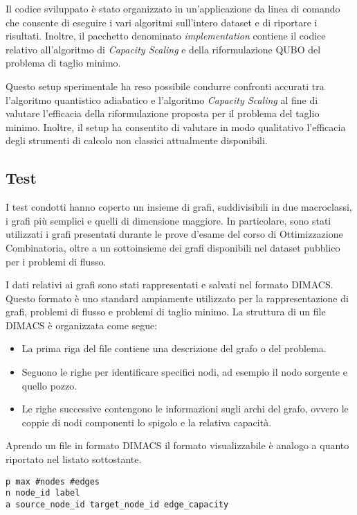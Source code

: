 \documentclass{article}
\begin{document}
Il codice sviluppato è stato organizzato in un'applicazione da linea di comando che consente di eseguire i vari algoritmi sull'intero dataset e di riportare i risultati. Inoltre, il pacchetto denominato \emph{implementation} contiene il codice relativo all'algoritmo di \emph{Capacity Scaling} e della riformulazione QUBO del problema di taglio minimo.

Questo setup sperimentale ha reso possibile condurre confronti accurati tra l'algoritmo quantistico adiabatico e l'algoritmo \emph{Capacity Scaling} al fine di valutare l'efficacia della riformulazione proposta per il problema del taglio minimo. Inoltre, il setup ha consentito di valutare in modo qualitativo l'efficacia degli strumenti di calcolo non classici attualmente disponibili.
\pagebreak

\subsection{Test}
I test condotti hanno coperto un insieme di grafi, suddivisibili in due macroclassi, i grafi più semplici e quelli di dimensione maggiore. In particolare, sono stati utilizzati i grafi presentati durante le prove d'esame del corso di Ottimizzazione Combinatoria, oltre a un sottoinsieme dei grafi disponibili nel dataset pubblico per i problemi di flusso\cite{Jensen2022}.

I dati relativi ai grafi sono stati rappresentati e salvati nel formato \textsc{DIMACS}. Questo formato è uno standard ampiamente utilizzato per la rappresentazione di grafi, problemi di flusso e problemi di taglio minimo. La struttura di un file \textsc{DIMACS} è organizzata come segue:

\begin{itemize}
    \item La prima riga del file contiene una descrizione del grafo o del problema.
    \item Seguono le righe per identificare specifici nodi, ad esempio il nodo sorgente e quello pozzo.
    \item Le righe successive contengono le informazioni sugli archi del grafo, ovvero le coppie di nodi componenti lo spigolo e la relativa capacità.
\end{itemize}

Aprendo un file in formato \textsc{DIMACS} il formato visualizzabile è analogo a quanto riportato nel listato sottostante.

\begin{lstlisting}
p max #nodes #edges
n node_id label
a source_node_id target_node_id edge_capacity    
\end{lstlisting}
\end{document}
